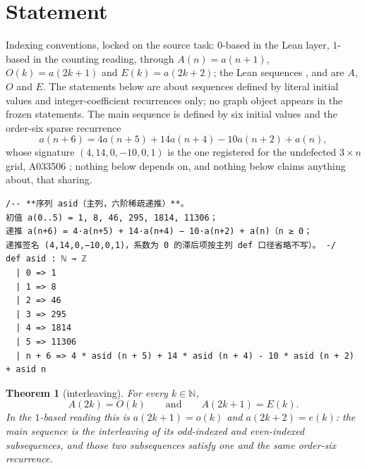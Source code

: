 \documentclass[11pt]{article}
\newtheorem{theorem}{Theorem}
\theoremstyle{definition}
\begin{document}
\section{Statement}\label{sec:statement}

Indexing conventions, locked on the source task: $0$-based in the Lean layer,
$1$-based in the counting reading, through $A(n)=a(n+1)$, $O(k)=a(2k+1)$ and
$E(k)=a(2k+2)$; the Lean sequences ,  and 
are $A$, $O$ and $E$. The statements below are about sequences defined by
literal initial values and integer-coefficient recurrences only; no graph
object appears in the frozen statements. The main sequence is defined by six
initial values and the order-six sparse recurrence
\[
  a(n+6)=4a(n+5)+14a(n+4)-10a(n+2)+a(n),
\]
whose signature $(4,14,0,-10,0,1)$ is the one registered for the undefected
$3\times n$ grid, A033506 \cite{oeis-a033506}; nothing below depends on, and
nothing below claims anything about, that sharing.

\begin{lstlisting}[caption={The main sequence \texttt{asid}, verbatim from the frozen statement file \texttt{formalized}\allowbreak/\texttt{01-comb08-sidemid-statements.lean} (lines 28--39, sha256 \texttt{5fe889d5}).},label={lst:asid}]
/-- **序列 asid（主列，六阶稀疏递推）**。
初值 a(0..5) = 1, 8, 46, 295, 1814, 11306；
递推 a(n+6) = 4·a(n+5) + 14·a(n+4) − 10·a(n+2) + a(n)（n ≥ 0；
递推签名 (4,14,0,−10,0,1)，系数为 0 的滞后项按主列 def 口径省略不写）。 -/
def asid : ℕ → ℤ
  | 0 => 1
  | 1 => 8
  | 2 => 46
  | 3 => 295
  | 4 => 1814
  | 5 => 11306
  | n + 6 => 4 * asid (n + 5) + 14 * asid (n + 4) - 10 * asid (n + 2) + asid n
\end{lstlisting}

\begin{theorem}[interleaving]\label{thm:interleave}
For every $k\in\mathbb{N}$,
\[
  A(2k)=O(k)\qquad\text{and}\qquad A(2k+1)=E(k).
\]
In the $1$-based reading this is $a(2k+1)=o(k)$ and $a(2k+2)=e(k)$: the main
sequence is the interleaving of its odd-indexed and even-indexed
subsequences, and those two subsequences satisfy one and the same order-six
recurrence.
\end{theorem}
\end{document}
